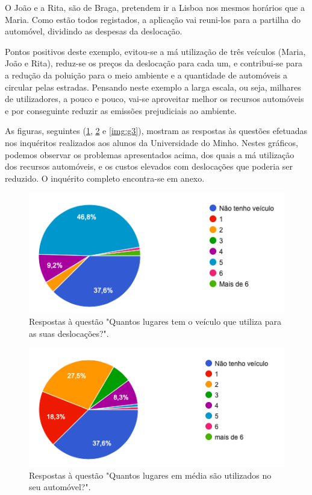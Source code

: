 \hspace{5mm} O João e a Rita, são de Braga, pretendem ir a Lisboa nos mesmos horários que a Maria. Como estão todos  registados, a aplicação vai reuni-los para a partilha do automóvel, dividindo as despesas da deslocação. 

\hspace{5mm} Pontos positivos deste exemplo, evitou-se a má utilização de três veículos (Maria, João e Rita), reduz-se os preços da deslocação para cada um, e contribui-se para a redução da poluição para o meio ambiente e a quantidade de automóveis a circular pelas estradas. Pensando neste exemplo a larga escala, ou seja, milhares de utilizadores, a pouco e pouco, vai-se aproveitar melhor os recursos automóveis e por conseguinte reduzir as emissões prejudiciais ao ambiente.

\hspace{5mm} As figuras, seguintes (\ref{img:g1}, \ref{img:g2} e \ref{img:g3}), mostram as respostas às questões efetuadas nos inquéritos realizados aos alunos da Universidade do Minho. Nestes gráficos, podemos observar os problemas apresentados acima, dos quais a má utilização dos recursos automóveis, e os custos elevados com deslocações que poderia ser reduzido. O inquérito completo encontra-se em anexo.

\begin{figure}[H]
    \centering
	\includegraphics[scale=0.65]{imagens/g1.png}
	\caption{Respostas à questão "Quantos lugares tem o veículo que utiliza para as suas deslocações?".}
	\label{img:g1}
\end{figure}

\begin{figure}[H]
    \centering
	\includegraphics[scale=0.65]{imagens/g2.png}
	\caption{Respostas à questão "Quantos lugares em média são utilizados no seu automóvel?".}
	\label{img:g2}
\end{figure}

